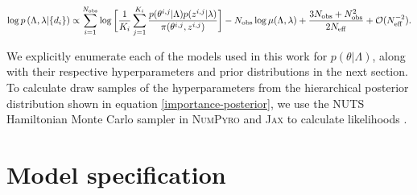 \begin{equation}\label{importance-posterior}
    \log p\left(\Lambda, \lambda | \{d_i\}\right) \propto \sum_{i=1}^{N_\mathrm{obs}} \log \bigg[ \frac{1}{K_i} \sum_{j=1}^{K_i} \frac{p(\theta^{i,j}|\Lambda)p(z^{i,j}|\lambda)}{\pi(\theta^{i,j}, z^{i,j})} \bigg] -  \\
    N_\mathrm{obs} \log \mu(\Lambda, \lambda) + \frac{3N_\mathrm{obs} + N_\mathrm{obs}^2}{2N_\mathrm{eff}} + \mathcal{O}(N_\mathrm{eff}^{-2}).
\end{equation}

We explicitly enumerate each of the models used in this work for $p(\theta|\Lambda)$, along with 
their respective hyperparameters and prior distributions in the next section. To calculate draw 
samples of the hyperparameters from the hierarchical posterior distribution shown in equation \ref{importance-posterior}, we use the 
NUTS Hamiltonian Monte Carlo sampler in \textsc{NumPyro} and \textsc{Jax} to calculate likelihoods \citep{jax,pyro,numpyro}.

\section{Model specification} \label{sec:modelpriors}



